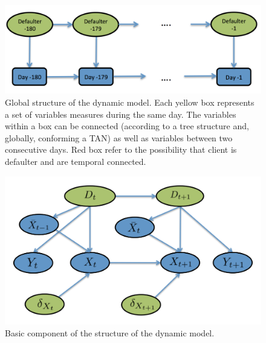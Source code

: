 \begin{figure}
\begin{center}
\includegraphics[scale=0.45]{./figures/CajaMarModel1}
\caption{Global structure of the dynamic model. Each yellow box represents a set of variables measures during the same day.
The variables within a box can be connected (according to a tree structure and, globally, conforming a TAN) as well as variables between two consecutive days. Red box refer to the possibility that 
client is defaulter and are temporal connected.}
\label{fig:global_temp}
\end{center}
\end{figure}

\begin{figure}
\begin{center}
\includegraphics[scale=0.35]{./figures/CajaMarModel2}
\caption{Basic component of the structure of the dynamic model.}
\label{fig:component}
\end{center}
\end{figure}


